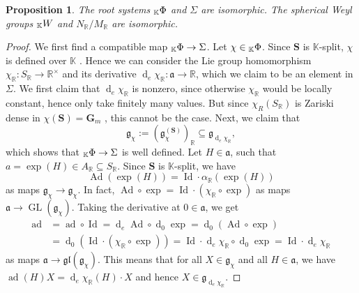 \documentclass[12pt]{amsart}
\newcommand{\R}{\mathbb{R} }
\newcommand{\K}{\mathbb{K}}
\newcommand{\frakg}{\mathfrak{g}}
\newcommand{\fraka}{\mathfrak{a}}
\newcommand{\bG}{\mathbf{G}}
\newcommand{\bS}{\mathbf{S}}
\newcommand{\KPhi}{\vphantom{\Phi}_{\K}\Phi}
\newcommand{\KW}{\vphantom{W}_{\K}W}
\numberwithin{equation}{section}
\newtheorem{proposition}[theorem]{Proposition}
\theoremstyle{remark} %
\begin{document}
\begin{proposition}\label{prop:rootsystem_compatible}
	The root systems $\KPhi$ and $\Sigma$ are isomorphic. The spherical Weyl groups $\KW$ and $N_\R / M_\R$ are isomorphic.
\end{proposition}
\begin{proof}
   We first find a compatible map $\KPhi \to \Sigma$. Let $\chi \in \KPhi$. Since $\bS$ is $\K$-split, $\chi$ is defined over $\K$ \cite[Corollary 8.2]{Bor}. Hence we can consider the Lie group homomorphism $\chi_{\R} \colon S_{\R} \to \R^{\times}$ and its derivative $\operatorname{d}_e\!\chi_{\R} \colon \fraka \to  \R$, which we claim to be an element in $\Sigma$. We first claim that $\operatorname{d}_e\!\chi_{\R}$ is nonzero, since otherwise $\chi_{\R}$ would be locally constant, hence only take finitely many values. But since $\chi_{R}(S_{\R})$ is Zariski dense in $\chi(\bS) = \bG_m$ \cite[Corollary 18.3]{Bor}, this cannot be the case. Next, we claim that 
   $$
   \frakg_{\chi} := \left(\frakg_{\chi}^{(\bS)}\right)_{\R} \subseteq \frakg_{\operatorname{d}_e\!\chi_{\R}},
   $$
   which shows that $\KPhi \to \Sigma$ is well defined. Let $H \in \fraka$, such that $a=\exp(H) \in A_{\R} \subseteq S_{\R}$. Since $\bS$ is $\K$-split, we have 
   $$
   \operatorname{Ad}(\exp(H)) = \operatorname{Id} \cdot \alpha_{\R}(\exp(H))
   $$ 
   as maps $\frakg_{\chi} \to \frakg_{\chi}$. In fact, $\operatorname{Ad}\circ \exp = \operatorname{Id} \cdot (\chi_{\R}\circ\exp)$ as maps $\fraka \to \operatorname{GL}(\frakg_{\chi})$. Taking the derivative at $0 \in \fraka$, we get
   \begin{align*}
\operatorname{ad} &= \operatorname{ad} \circ \operatorname{Id} =\operatorname{d}_e\!\operatorname{Ad} \circ \operatorname{d}_0 \exp =  \operatorname{d}_0 ( \operatorname{Ad} \circ \exp ) \\
&= \operatorname{d}_0 (\operatorname{Id} \cdot (\chi_{\R}\circ\exp)) = \operatorname{Id}\cdot \operatorname{d}_e\!\chi_{\R} \circ \operatorname{d}_0\exp = \operatorname{Id}\cdot  \operatorname{d}_e\!\chi_{\R}
   \end{align*}
   as maps $\fraka \to \mathfrak{gl}(\frakg_{\chi})$. This means that for all $X \in \frakg_{\chi}$ and all $H \in \fraka$, we have $\operatorname{ad}(H)X = \operatorname{d}_e\! \chi_{\R}(H)\cdot X$ and hence $X \in \frakg_{\operatorname{d}_e\!\chi_{\R}}$.
   

\end{proof}
\end{document}
